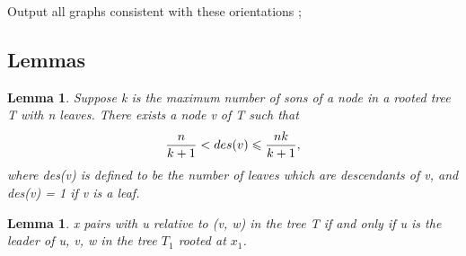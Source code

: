 \documentclass[12pt,a4paper]{article}
\newtheorem{lemma}[theorem]{Lemma}
\theoremstyle{definition}
\begin{document}
\begin{appendix}
\begin{algorithm}[H]
	
	Output all graphs consistent with these orientations ;
	
\end{algorithm}
\vspace{0.01\linewidth}

\subsection{Lemmas}
\label{apd:lemma}

\begin{lemma}
	\label{lemma:1}
	Suppose k is the maximum number of sons of a node in a rooted tree T with n leaves. There exists a node v of T such that
	\begin{equation*}
		\centering
		\dfrac{n}{k+1} < des(v) \leqslant \dfrac{nk}{k+1},
	\end{equation*}
	where des(v) is defined to be the number of leaves which are descendants of v, and des(v) = 1 if v is a leaf.
\end{lemma}

\begin{lemma}
	\label{lemma:2}
	x pairs with u relative to (v, w) in the tree T if and only if u is the leader of u, v, w in the tree $T_1$ rooted at $x_1$.
\end{lemma}


\end{appendix}



\end{document}
